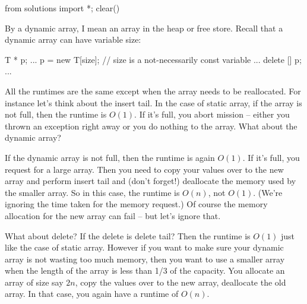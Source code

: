 \begin{python0}
from solutions import *; clear()
\end{python0}

By a dynamic array, I mean an array in the heap or free store.
Recall that a dynamic array can have variable size:
\begin{console}[fontsize=\footnotesize]
T * p;
...
p = new T[size]; // size is a not-necessarily const variable
...
delete [] p;
...
\end{console}

All the runtimes are the same except when the array needs to be reallocated.
For instance let's think about the insert tail.
In the case of static array, if the array is not full,
then the runtime is $O(1)$.
If it's full, you abort mission -- either you thrown
an exception right away or you do nothing to the array.
What about the dynamic array?

If the dynamic array is not full, then the runtime is
again $O(1)$.
If it's full, you request for a large array.
Then you need to copy your values over to the new array
and perform insert tail and (don't forget!) deallocate the
memory used by the smaller array.
So in this case, the runtime is $O(n)$, not $O(1)$.
(We're ignoring the time taken for the memory request.)
Of course the memory allocation for the new array can fail --
but let's ignore that.

What about delete?
If the delete is delete tail?
Then the runtime is $O(1)$ just like the case of static array.
However if you want to make sure your dynamic array is not
wasting too much memory, then you want to use a smaller array
when the length of the array is less than 1/3 of the capacity.
You allocate an array of size say $2n$, copy the values over to the
new array, deallocate the old array.
In that case, you again have a runtime of $O(n)$.
